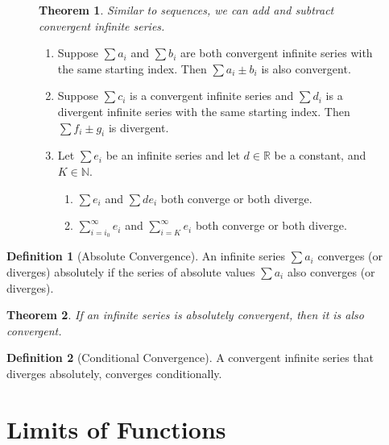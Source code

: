 \documentclass{article}
\newcommand*{\N}{\mathbb{N}}
\newcommand*{\R}{\mathbb{R}}
\theoremstyle{plain}
\newtheorem{theorem}{Theorem}[section]
\numberwithin{theorem}{subsection}
\theoremstyle{definition}
\newtheorem{definition}{Definition}[section]
\numberwithin{definition}{subsection}
\theoremstyle{remark}
\numberwithin{note}{subsection}
\begin{document}
\begin{figure}[H]
	\begin{mdframed}[style=exampledefault]
		\begin{theorem}
			Similar to sequences, we can add and subtract convergent infinite series.
		\end{theorem}

		\begin{enumerate}
			\item Suppose $\sum a_i$ and $\sum b_i$ are both convergent infinite series with the same starting index. Then $\sum a_i \pm b_i$ is also convergent.
			\item Suppose $\sum c_i$ is a convergent infinite series and $\sum d_i$ is a divergent infinite series with the same starting index. Then $\sum f_i \pm g_i$ is divergent.
			\item Let $\sum e_i$ be an infinite series and let $d\in\R$ be a constant, and $K\in\N$.
			\begin{enumerate}
				\item $\sum e_i$ and $\sum d e_i$ both converge or both diverge.
				\item $\sum_{i=i_0}^\infty e_i$ and $\sum_{i=K}^\infty e_i$ both converge or both diverge.
			\end{enumerate}
		\end{enumerate}

	\end{mdframed}
\end{figure}
%
\begin{definition}[Absolute Convergence]
	An infinite series $\sum a_i$ converges (or diverges) absolutely if the series of absolute values $\sum a_i$ also converges (or diverges).
\end{definition}
\begin{theorem}
	If an infinite series is absolutely convergent, then it is also convergent.
\end{theorem}
%
\begin{definition}[Conditional Convergence]
	A convergent infinite series that diverges absolutely, converges conditionally.
\end{definition}
\section{Limits of Functions}
\end{document}
